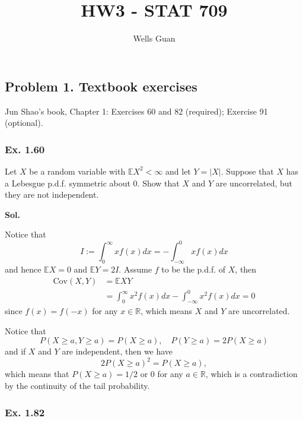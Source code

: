 \documentclass[lang=en,11pt,a4paper,citestyle=authoryear]{elegantpaper}
\title{HW3 - STAT 709}
\author{Wells Guan}
\newcommand{\R}{\mathbb{R}}
\newcommand{\E}{\mathbb{E}}
\begin{document}
\maketitle

\subsection*{Problem 1. Textbook exercises}
Jun Shao's book, Chapter 1: Exercises 60 and 82 (required); Exercise 91 (optional).

\subsubsection*{Ex. 1.60}
Let $X$ be a random variable with $\E X^2 < \infty$ and let $Y = |X|$. Suppose that $X$ has a Lebesgue p.d.f. symmetric about $0$. Show that $X$ and $Y$ are uncorrelated, but they are not independent.
\par\vspace{0.5em}
\textbf{Sol.}\par
Notice that
\[
I:= \int_0^{\infty} xf(x)dx = -\int_{-\infty}^0 x f(x)dx
\]
and hence $\E X = 0$ and $\E Y = 2I$. Assume $f$ to be the p.d.f. of $X$, then
\[
\begin{aligned}
    \text{Cov}(X,Y) &= \E XY \\
    &= \int_0^{\infty} x^2 f(x)dx -\int_{-\infty}^0 x^2f(x)dx = 0  
\end{aligned}
\]
since $f(x) = f(-x)$ for any $x\in\R$, which means $X$ and $Y$ are uncorrelated.\par
Notice that
\[
P(X \geq a, Y\geq a) = P(X\geq a), \quad P(Y\geq a) = 2P(X\geq a)  
\]
and if $X$ and $Y$ are independent, then we have
\[2P(X\geq a)^2 = P(X\geq a),\] which means that $P(X\geq a) = 1/2$ or $0$ for any $a \in \R$, which is a contradiction by the continuity of the tail probability.
\vspace{1em}

\subsubsection*{Ex. 1.82}
\end{document}
